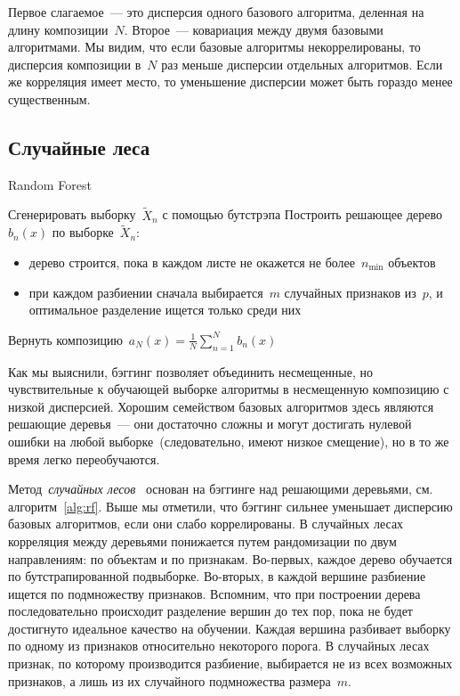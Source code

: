 \documentclass[12pt,fleqn]{article}
\begin{document}
Первое слагаемое~--- это дисперсия одного базового алгоритма,
деленная на длину композиции~$N$.
Второе~--- ковариация между двумя базовыми алгоритмами.
Мы видим, что если базовые алгоритмы некоррелированы,
то дисперсия композиции в~$N$ раз меньше дисперсии отдельных алгоритмов.
Если же корреляция имеет место, то уменьшение дисперсии может быть гораздо
менее существенным.

\subsection{Случайные леса}

\begin{algorithm}[t]
\caption{Random Forest}
\label{alg:rf}
    \begin{algorithmic}[1]
            \STATE Сгенерировать выборку~$\tilde X_n$ с помощью бутстрэпа
            \STATE Построить решающее дерево~$b_n(x)$ по выборке~$\tilde X_n$:
                \begin{itemize}
                    \item дерево строится, пока в каждом листе не окажется не более~$n_{\min}$ объектов
                    \item при каждом разбиении сначала выбирается~$m$ случайных
                        признаков из~$p$, и оптимальное разделение ищется только среди них
                \end{itemize}
        \ENDFOR
        \STATE Вернуть композицию~$a_N(x) = \frac{1}{N} \sum_{n = 1}^{N} b_n(x)$
    \end{algorithmic}
\end{algorithm}

Как мы выяснили, бэггинг позволяет объединить несмещенные,
но чувствительные к обучающей выборке алгоритмы в несмещенную
композицию с низкой дисперсией.
Хорошим семейством базовых алгоритмов здесь являются решающие деревья~---
они достаточно сложны и могут достигать нулевой ошибки
на любой выборке~(следовательно, имеют низкое смещение),
но в то же время легко переобучаются.

Метод~\emph{случайных лесов}~\cite{breiman01randomforest} основан на бэггинге над решающими деревьями,
см. алгоритм~\ref{alg:rf}.
Выше мы отметили, что бэггинг сильнее уменьшает дисперсию
базовых алгоритмов, если они слабо коррелированы.
В случайных лесах корреляция между деревьями понижается путем рандомизации
по двум направлениям: по объектам и по признакам.
Во-первых, каждое дерево обучается по бутстрапированной подвыборке.
Во-вторых, в каждой вершине разбиение ищется по подмножеству признаков.
Вспомним, что при построении дерева последовательно происходит
разделение вершин до тех пор, пока не будет достигнуто идеальное
качество на обучении.
Каждая вершина разбивает выборку по одному из признаков
относительно некоторого порога.
В случайных лесах признак, по которому производится разбиение,
выбирается не из всех возможных признаков, а лишь из
их случайного подмножества размера~$m$.
\end{document}

